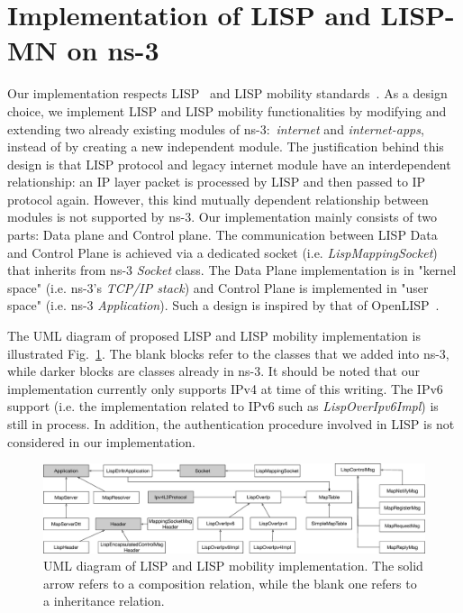 
 
\section{Implementation of LISP and LISP-MN on ns-3}
\label{sec:ns3_lispmn}
Our implementation respects LISP~\cite{rfc6830} and LISP mobility standards~\cite{meyer2016lisp}. As a design choice, we implement LISP and LISP mobility functionalities by modifying and extending two already existing modules of ns-3:~\emph{internet} and \emph{internet-apps}, instead of by creating a new independent module. The justification behind this design is that LISP protocol and legacy internet module have an interdependent relationship: an IP layer packet is processed by LISP and then passed to IP protocol again. However, this kind mutually dependent relationship between modules is not supported by ns-3. Our implementation mainly consists of two parts: Data plane and Control plane. The communication between LISP Data and Control Plane is achieved via a dedicated socket (i.e. \emph{LispMappingSocket}) that inherits from ns-3 \emph{Socket} class. The Data Plane implementation is in "kernel space" (i.e. ns-3's \emph{TCP/IP stack}) and Control Plane is implemented in "user space" (i.e. ns-3 \emph{Application}). Such a design is inspired by that of OpenLISP~\cite{saucez2009openlisp}.  

The UML diagram of proposed LISP and LISP mobility implementation is illustrated Fig.~\ref{LISP-UML}. The blank blocks refer to the classes that we added into ns-3, while darker blocks are classes already in ns-3. It should be noted that our implementation currently only supports IPv4 at time of this writing. The IPv6 support (i.e. the implementation related to IPv6 such as \emph{LispOverIpv6Impl}) is still in process. In addition, the authentication procedure involved in LISP is not considered in our implementation.
\begin{figure}[!t]
	\centering
	\includegraphics[width=\textwidth]{Pics/LISP-NS3-UML}
	\caption{UML diagram of LISP and LISP mobility implementation. The solid arrow refers to a composition relation, while the blank one refers to a inheritance relation.}
	\label{LISP-UML}
\end{figure}
